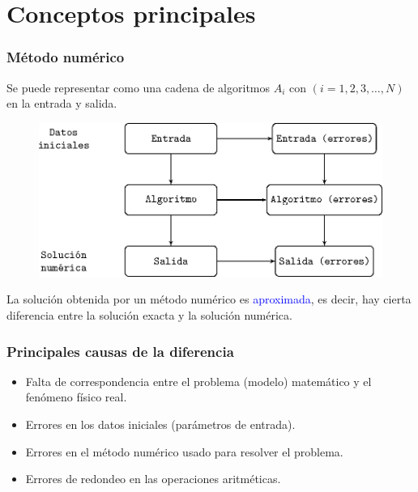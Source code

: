 \section{Conceptos principales}
\begin{frame}
\frametitle{Método numérico}
Se puede representar como una cadena de algoritmos $A_{i}$ con $(i = 1, 2, 3, \ldots , N)$ en la entrada y salida.
\begin{figure}
\centering
\includegraphics[scale=1]{dibujometodonum.eps} 
\end{figure}
\end{frame}
\begin{frame}
La solución obtenida por un método numérico es \textcolor{blue}{aproximada}, es decir, hay cierta diferencia entre la solución exacta y la solución numérica.
\end{frame}
\begin{frame}
\frametitle{Principales causas de la diferencia}
\begin{itemize}[<+->]
\item Falta de correspondencia entre el problema (modelo) matemático y el fenómeno físico real.
\item Errores en los datos iniciales (parámetros de entrada).
\item Errores en el método numérico usado para resolver el problema.
\item Errores de redondeo en las operaciones aritméticas.
\end{itemize}
\end{frame}
